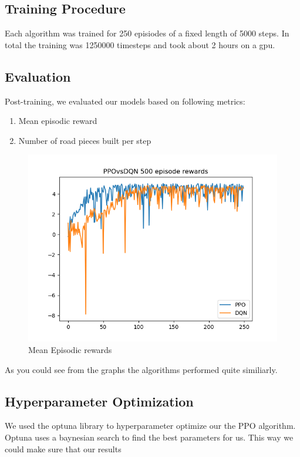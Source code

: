 \documentclass[conference]{IEEEtran}
\begin{document}
	\subsection{Training Procedure}
	Each algorithm was trained for 250 episiodes of a fixed length of 5000 steps. In total the training was 1250000 timesteps and took about 2 hours on a gpu.

	\subsection{Evaluation}
	Post-training, we evaluated our models based on following metrics:
	\begin{enumerate}
		\item Mean episodic reward
		\item Number of road pieces built per step
	\end{enumerate}

	\begin{figure}[h!]
		\includegraphics[width=\columnwidth]{graphs/PPOvsDQN250.png}
		\caption{Mean Episodic rewards}
	\end{figure}

	As you could see from the graphs the algorithms performed quite similiarly.

	\subsection{Hyperparameter Optimization}
	We used the optuna library to hyperparameter optimize our the PPO algorithm. Optuna uses a baynesian search to find the best parameters for us. This way we could make sure that our results
\end{document}
